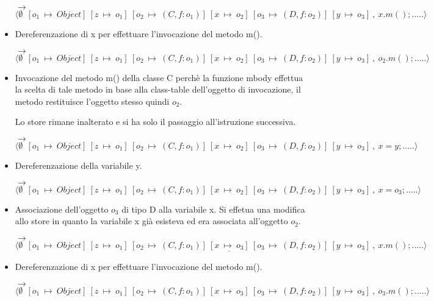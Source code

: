\begin{itemize}
$\rightarrow$ $\langle\emptyset\:\:[o_1\:\mapsto\:Object]\:[z\:\mapsto\:o_1]\:[o_2\:\mapsto\:(C,f:o_1)]\:[x\:\mapsto\:o_2]\:[o_3\:\mapsto\:(D,f:o_2)]\:[y\:\mapsto\:o_3]\:,\:x.m();.....\rangle$

\vspace{0,5cm}
\item Dereferenzazione di x per effettuare l'invocazione del metodo m().

$\rightarrow$ $\langle\emptyset\:\:[o_1\:\mapsto\:Object]\:[z\:\mapsto\:o_1]\:[o_2\:\mapsto\:(C,f:o_1)]\:[x\:\mapsto\:o_2]\:[o_3\:\mapsto\:(D,f:o_2)]\:[y\:\mapsto\:o_3]\:,\:o_2.m();.....\rangle$

\vspace{0,5cm}
\item Invocazione del metodo m() della classe C perch\`e la funzione mbody effettua la scelta di tale metodo in base alla class-table dell'oggetto di invocazione, il metodo restituisce l'oggetto stesso quindi $o_2$.

Lo store rimane inalterato e si ha solo il passaggio all'istruzione successiva.

$\rightarrow$ $\langle\emptyset\:\:[o_1\:\mapsto\:Object]\:[z\:\mapsto\:o_1]\:[o_2\:\mapsto\:(C,f:o_1)]\:[x\:\mapsto\:o_2]\:[o_3\:\mapsto\:(D,f:o_2)]\:[y\:\mapsto\:o_3]\:,\:x=y;.....\rangle$

\vspace{0,5cm}
\item Dereferenzazione della variabile y.

$\rightarrow$ $\langle\emptyset\:\:[o_1\:\mapsto\:Object]\:[z\:\mapsto\:o_1]\:[o_2\:\mapsto\:(C,f:o_1)]\:[x\:\mapsto\:o_2]\:[o_3\:\mapsto\:(D,f:o_2)]\:[y\:\mapsto\:o_3]\:,\:x=o_3;.....\rangle$

\vspace{0,5cm}
\item Associazione dell'oggetto $o_3$ di tipo D alla variabile x. Si effetua una modifica allo store in quanto la variabile x gi\`a esisteva ed era associata all'oggetto $o_2$.

$\rightarrow$ $\langle\emptyset\:\:[o_1\:\mapsto\:Object]\:[z\:\mapsto\:o_1]\:[o_2\:\mapsto\:(C,f:o_1)]\:\underline{[x\:\mapsto\:o_3]}\:[o_3\:\mapsto\:(D,f:o_2)]\:[y\:\mapsto\:o_3]\:,\:x.m();.....\rangle$

\vspace{0,5cm}
\item Dereferenzazione di x per effettuare l'invocazione del metodo m().

$\rightarrow$ $\langle\emptyset\:\:[o_1\:\mapsto\:Object]\:[z\:\mapsto\:o_1]\:[o_2\:\mapsto\:(C,f:o_1)]\:[x\:\mapsto\:o_3]\:[o_3\:\mapsto\:(D,f:o_2)]\:[y\:\mapsto\:o_3]\:,\:o_3.m();.....\rangle$


\end{itemize}
